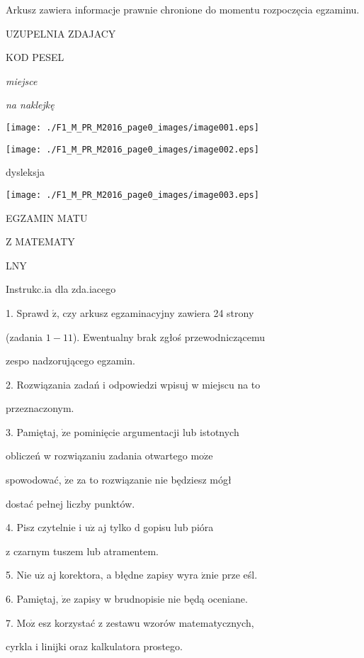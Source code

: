 \documentclass[a4paper,12pt]{article}
\begin{document}
Arkusz zawiera informacje prawnie chronione do momentu rozpoczęcia egzaminu.

UZUPELNIA ZDAJACY

KOD PESEL

{\it miejsce}

{\it na naklejkę}
\begin{center}
\texttt{[image: ./F1\_M\_PR\_M2016\_page0\_images/image001.eps]}

\texttt{[image: ./F1\_M\_PR\_M2016\_page0\_images/image002.eps]}
\end{center}
\fbox{} dysleksja
\begin{center}
\texttt{[image: ./F1\_M\_PR\_M2016\_page0\_images/image003.eps]}
\end{center}
EGZAMIN MATU

Z MATEMATY

LNY

Instrukc.ia dla zda.iacego

1. Sprawd $\acute{\mathrm{z}}$, czy arkusz egzaminacyjny zawiera 24 strony

(zadania $1-11$). Ewentualny brak zgłoś przewodniczącemu

zespo nadzorującego egzamin.

2. Rozwiązania zadań i odpowiedzi wpisuj w miejscu na to

przeznaczonym.

3. Pamiętaj, $\dot{\mathrm{z}}\mathrm{e}$ pominięcie argumentacji lub istotnych

obliczeń w rozwiązaniu zadania otwartego $\mathrm{m}\mathrm{o}\dot{\mathrm{z}}\mathrm{e}$

spowodować, $\dot{\mathrm{z}}\mathrm{e}$ za to rozwiązanie nie będziesz mógł

dostać pełnej liczby punktów.

4. Pisz czytelnie i $\mathrm{u}\dot{\mathrm{z}}$ aj tylko $\mathrm{d}$ gopisu lub pióra

z czarnym tuszem lub atramentem.

5. Nie $\mathrm{u}\dot{\mathrm{z}}$ aj korektora, a błędne zapisy wyra $\acute{\mathrm{z}}\mathrm{n}\mathrm{i}\mathrm{e}$ prze eśl.

6. Pamiętaj, $\dot{\mathrm{z}}\mathrm{e}$ zapisy w brudnopisie nie będą oceniane.

7. $\mathrm{M}\mathrm{o}\dot{\mathrm{z}}$ esz korzystać z zestawu wzorów matematycznych,

cyrkla i linijki oraz kalkulatora prostego.
\end{document}
